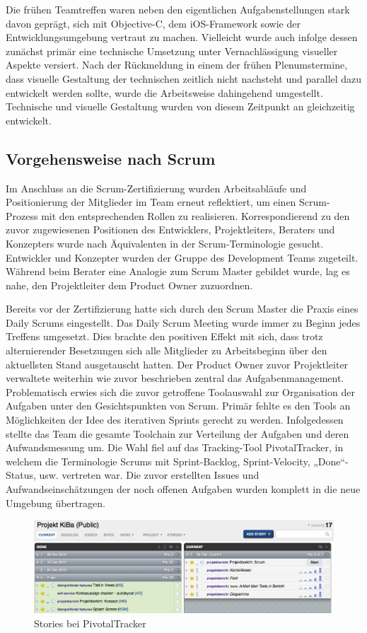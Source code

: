 	Die frühen Teamtreffen waren neben den eigentlichen Aufgabenstellungen stark davon geprägt, sich mit Objective-C, dem iOS-Framework sowie der Entwicklungsumgebung vertraut zu machen. Vielleicht wurde auch infolge dessen zunächst primär eine technische Umsetzung unter Vernachlässigung visueller Aspekte versiert. Nach der Rückmeldung in einem der frühen Plenumstermine, dass visuelle Gestaltung der technischen zeitlich nicht nachsteht und parallel dazu entwickelt werden sollte, wurde die Arbeitsweise dahingehend umgestellt. Technische und visuelle Gestaltung wurden von diesem Zeitpunkt an gleichzeitig entwickelt. 

\subsection{Vorgehensweise nach Scrum}
	Im Anschluss an die Scrum-Zertifizierung wurden Arbeitsabläufe und Positionierung der Mitglieder im Team erneut reflektiert, um einen Scrum-Prozess mit den entsprechenden Rollen zu realisieren. Korrespondierend zu den zuvor zugewiesenen Positionen des Entwicklers, Projektleiters, Beraters und Konzepters wurde nach Äquivalenten in der Scrum-Terminologie gesucht. Entwickler und Konzepter wurden der Gruppe des Development Teams zugeteilt. Während beim Berater eine Analogie zum Scrum Master gebildet wurde, lag es nahe, den Projektleiter dem Product Owner zuzuordnen. 

	Bereits vor der Zertifizierung hatte sich durch den Scrum Master die Praxis eines Daily Scrums eingestellt. Das Daily Scrum Meeting wurde immer zu Beginn jedes Treffens umgesetzt. Dies brachte den positiven Effekt mit sich, dass trotz alternierender Besetzungen sich alle Mitglieder zu Arbeitsbeginn über den aktuellsten Stand ausgetauscht hatten. Der Product Owner zuvor Projektleiter verwaltete weiterhin wie zuvor beschrieben zentral das Aufgabenmanagement. 
Problematisch erwies sich die zuvor getroffene Toolauswahl zur Organisation der Aufgaben unter den Gesichtspunkten von Scrum. Primär fehlte es den Tools an Möglichkeiten der Idee des iterativen Sprints gerecht zu werden. Infolgedessen stellte das Team die gesamte Toolchain zur Verteilung der Aufgaben und deren Aufwandsmessung um. Die Wahl fiel auf das Tracking-Tool PivotalTracker, in welchem die Terminologie Scrums mit Sprint-Backlog, Sprint-Velocity, „Done“- Status, usw. vertreten war. Die zuvor erstellten Issues und Aufwandseinschätzungen der noch offenen Aufgaben wurden komplett in die neue Umgebung übertragen.

\begin{figure}[h]
	\centering
	\includegraphics[scale=.25]{Pictures/pivottracker-overview}
	\caption{Stories bei PivotalTracker\label{fig:Pivottracker}}
\end{figure}

